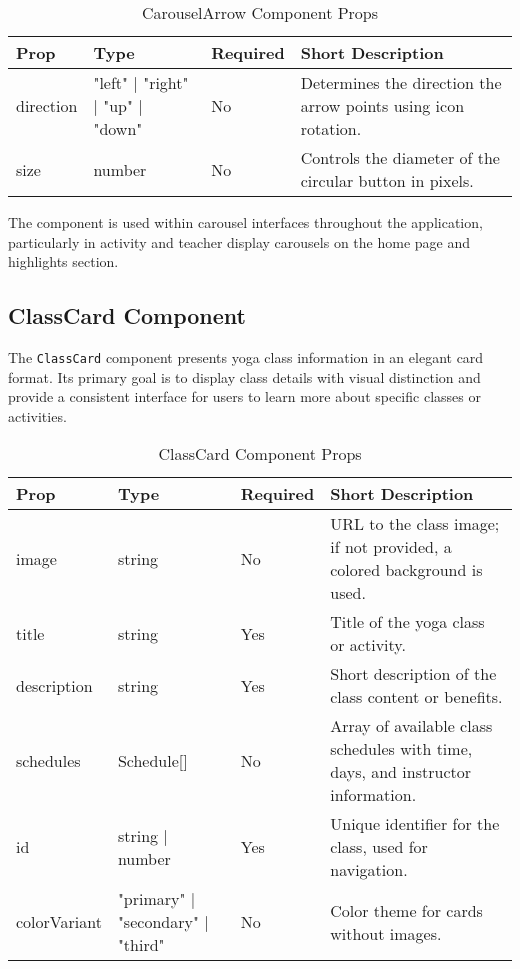 \begin{table}[H]
    \centering
    \setlength{\tabcolsep}{5pt}
    \renewcommand{\arraystretch}{1.2}
    \begin{tabular}{|p{2.2cm}|p{3.6cm}|p{1.5cm}|p{6cm}|}
        \hline
        \rowcolor{bluepoli!20}
        \textbf{Prop} & \textbf{Type} & \textbf{Required} & \textbf{Short Description} \\
        \hline
        direction & "left" | "right" | "up" | "down" & No & Determines the direction the arrow points using icon rotation. \\
        \hline
        size & number & No & Controls the diameter of the circular button in pixels. \\
        \hline
    \end{tabular}
    \caption{CarouselArrow Component Props}
\end{table}

The component is used within carousel interfaces throughout the application, particularly in activity and teacher display carousels on the home page and highlights section.

\subsection{ClassCard Component}
The \texttt{ClassCard} component presents yoga class information in an elegant card format. Its primary goal is to display class details with visual distinction and provide a consistent interface for users to learn more about specific classes or activities.

\begin{table}[H]
    \centering
    \setlength{\tabcolsep}{5pt}
    \renewcommand{\arraystretch}{1.2}
    \begin{tabular}{|p{2.2cm}|p{3.6cm}|p{1.5cm}|p{6cm}|}
        \hline
        \rowcolor{bluepoli!20}
        \textbf{Prop} & \textbf{Type} & \textbf{Required} & \textbf{Short Description} \\
        \hline
        image & string & No & URL to the class image; if not provided, a colored background is used. \\
        \hline
        title & string & Yes & Title of the yoga class or activity. \\
        \hline
        description & string & Yes & Short description of the class content or benefits. \\
        \hline
        schedules & Schedule[] & No & Array of available class schedules with time, days, and instructor information. \\
        \hline
        id & string | number & Yes & Unique identifier for the class, used for navigation. \\
        \hline
        colorVariant & "primary" | "secondary" | "third" & No & Color theme for cards without images. \\
        \hline
    \end{tabular}
    \caption{ClassCard Component Props}
\end{table}


